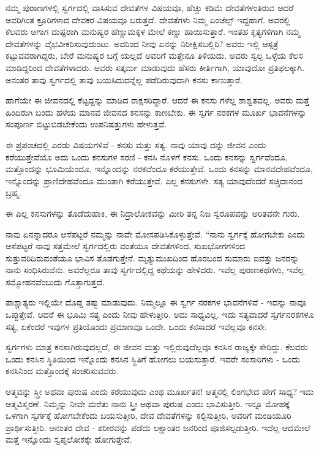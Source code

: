 ನಮ್ಮ ಪುರಾಣಗಳಲ್ಲಿ ಸ್ವರ್ಗದಲ್ಲಿ ವಾಸಿಸುವ ದೇವತೆಗಳ ವಿಷಯವೂ, ಹೆಚ್ಚು ಕಡಿಮೆ ದೇವತೆಗಳಂತಿರುವ ಆದರೆ ಅವರಿಗಿಂತ ಕ್ರೂರಿಗಳಾದ ದೇವಕರ ವಿಷಯವೂ ಬರುತ್ತದೆ. ದೇವತೆಗಳು ನಿಮ್ಮ ಏಂಜೆಲ್ಸ್  ಇದ್ದಹಾಗೆ. ಅವರಲ್ಲಿ ಕೆಲವರು ಆಗಾಗ ದುಷ್ಟರಾಗಿ ಮನುಷ್ಯರ ಹೆಣ್ಣುಮಕ್ಕಳ ಮೇಲೆ ಕಣ್ಣು ಹಾಯಿಸುತ್ತಾರೆ. ಇಂತಹ ಕೃತ್ಯಗಳಿಗಾಗಿ ನಮ್ಮ ದೇವತೆಗಳನ್ನು ವೈಭವೀಕರಿಸುವುದುಂಟು. ಅವರಿಂದ ನೀವು ಏನನ್ನು ನಿರೀಕ್ಷಿಸಬಲ್ಲಿರಿ? ಅವರು ಇಲ್ಲಿ ಆಸ್ಪತ್ರೆ ಕಟ್ಟುವವರಾಗಿದ್ದರು, ಬೇರೆ ಮನುಷ್ಯರ ಬಗ್ಗೆ ಯಲ್ಲದೆ ಅವರಿಗೆ ಮತ್ತೇನೂ ತಿಳಿಯದು. ಅವರು ಸ್ವಲ್ಪ ಒಳ್ಳೆಯ ಕೆಲಸ ಮಾಡಿದ್ದರಿಂದ ದೇವತೆಗಳಾದರು. ಅವರು ಸತ್ಕರ್ಮ ಮಾಡುವುದು ಹೆಸರು ಕೀರ್ತಿಗಾಗಿ, ಯಾವುದೋ ಪ್ರತಿಫಲಕ್ಕಾಗಿ. ಅನಂತರ ತಾವು ಸ್ವರ್ಗದಲ್ಲಿ ತಾವು ಬಯಸಿದುದನ್ನೆಲ್ಲ ಪಡೆದಿರುವುದಾಗಿ ಕನಸು ಕಾಣುತ್ತಾರೆ.

ಹಾಗೆಯೇ ಈ ಜೀವನದಲ್ಲಿ ಕೆಟ್ಟದ್ದನ್ನು ಮಾಡಿದ ರಾಕ್ಷಸರಿದ್ದಾರೆ. ಆದರೆ ಈ ಕನಸು ಗಳೆಲ್ಲ ಶಾಶ್ವತವಲ್ಲ. ಅವರು ಮತ್ತೆ ಹಿಂದಿರುಗಿ ಬಂದು ಹಳೆಯ ಮಾನವ ಜೀವನದ ಕನಸನ್ನು ಕಾಣಬೇಕು. ಈ ಸ್ವರ್ಗ ನರಕಗಳ ಮೂರ್ಖ ಭಾವನೆಗಳನ್ನು ಸಂಪೂರ್ಣ ಬಿಟ್ಟುಬಿಡಬೇಕೆಂದು ಉಪನಿಷತ್ತುಗಳು ಹೇಳುತ್ತವೆ.

ಈ ಪ್ರಪಂಚದಲ್ಲಿ ಎರಡು ವಿಷಯಗಳಿವೆ - ಕನಸು ಮತ್ತು ಸತ್ಯ. ನಾವು ಯಾವು ದನ್ನು ಜೀವನ ಎಂದು ಕರೆಯುತ್ತೇವೆಯೊ ಅದು ಒಂದು ಕನಸುಗಳ ಸರಣಿ - ಕನಸಿ ನೊಳಗೆ ಕನಸು. ಒಂದು ಕನಸನ್ನು ಸ್ವರ್ಗವೆಂದೂ, ಮತ್ತೊಂದನ್ನು ಭೂಮಿಯೆಂದೂ, ಇನ್ನೊಂದನ್ನು ನರಕವೆಂದೂ ಕರೆಯುತ್ತೇವೆ. ಒಂದು ಕನಸನ್ನು ಮಾನವದೇಹವೆಂದೂ, ಇನ್ನೊಂದನ್ನು ಪ್ರಾಣಿದೇಹವೆಂದೂ ಮುಂತಾಗಿ ಕರೆಯುತ್ತೇವೆ. ಎಲ್ಲ ಕನಸುಗಳೇ. ಸತ್ಯ ಯಾವುದೆಂದರೆ ಸಚ್ಚಿದಾನಂದ ಬ್ರಹ್ಮ.

ಈ ಎಲ್ಲ ಕನಸುಗಳನ್ನು ತೊಡೆದುಹಾಕಿ, ಈ ನಿದ್ರಾಲೋಕವನ್ನು ಮೀರಿ ತನ್ನ ನಿಜ ಸ್ವರೂಪವನ್ನು ಅರಿತವನೇ ಗುರು.

ನಾವು ಏನನ್ನಾದರೂ ಆಸೆಪಟ್ಟರೆ ನಮ್ಮನ್ನು ನಾವೇ ಮೋಸಪಡಿಸಿಕೊಳ್ಳುತ್ತೇವೆ. “ನಾನು ಸ್ವರ್ಗಕ್ಕೆ ಹೋಗಬೇಕು ಎಂದು ಆಸೆಪಟ್ಟರೆ ನಾವು ಸತ್ತಮೇಲೆ ಸ್ವರ್ಗದಲ್ಲಿರು ವಂತೆಯೂ ದೇವತೆಗಳಿಂದ, ಸುಖಭೋಗಗಳಿಂದ ಸುತ್ತುವರಿದಿರುವಂತೆಯೂ ಭಾವಿಸ ತೊಡಗುತ್ತೇನೆ. ಮೃತ್ಯುಮುಖದಿಂದ ಹೊರಬಂದ ಸುಮಾರು ಐವತ್ತು ಜನರನ್ನು ನಾನು ಸಂಧಿಸಿರುವೆನು. ಅವರೆಲ್ಲರೂ ತಾವು ಸ್ವರ್ಗದಲ್ಲಿದ್ದ ಕಥೆಯನ್ನು ಹೇಳಿದರು. ಇವೆಲ್ಲ ಪುರಾಣಕಥೆಗಳು, ಇವೆಲ್ಲ ಸಮ್ಮೋಹನವೆಂಬುದು ಗೊತ್ತಾಗುತ್ತದೆ.

ಪಾಶ್ಚಾತ್ಯರು ಇಲ್ಲಿಯೇ ದೊಡ್ಡ ತಪ್ಪು ಮಾಡುವುದು. ನಿಮ್ಮಲ್ಲೂ ಈ ಸ್ವರ್ಗ ನರಕಗಳ ಭಾವನೆಗಳಿವೆ - ಇದನ್ನು ನಾವೂ ಒಪ್ಪುತ್ತೇವೆ. ಆದರೆ ಈ ಭೂಮಿ ಸತ್ಯ ಎಂದು ನೀವು ಹೇಳುತ್ತೀರಿ. ಅದು ಸಾಧ್ಯವಿಲ್ಲ. ಇದು ಸತ್ಯವಾದರೆ ಸ್ವರ್ಗನರಕಗಳೂ ಸತ್ಯ, ಏಕೆಂದರೆ ಇವುಗಳ ಪ್ರತಿಯೊಂದು ಪ್ರಮಾಣವೂ ಒಂದೇ. ಒಂದು ಕನಸಾದರೆ ಇವೆಲ್ಲವೂ ಕನಸೇ.

ಸ್ವರ್ಗಗಳು ಮಾತ್ರ ಕನಸಾಗಿರುವುದಲ್ಲದೆ, ಈ ಜೀವನ ಮತ್ತು ಇಲ್ಲಿರುವುದೆಲ್ಲವೂ ಕನಸಿನ ರಾಜ್ಯಕ್ಕೇ ಸೇರಿದ್ದು. ಕೆಲವರು ಒಂದು ಕನಸಿನ ಸ್ಥಿತಿಯಿಂದ ಇನ್ನೊಂದು ಕನಸಿನ ಸ್ಥಿತಿಗೆ ಹೋಗಲು ಬಯಸುತ್ತಾರೆ. ಇವರೇ ಸಂಸಾರಿಗಳು - ಒಂದು ಕನಸಿನಿಂದ ಮತ್ತೊಂದಕ್ಕೆ ಸಂಚರಿಸುವವರು.

ಆತ್ಮವನ್ನು ಸ್ತ್ರೀ ಅಥವಾ ಪುರುಷ ಎಂದು ಕರೆಯುವುದು ಎಂಥ ಮೂರ್ಖತನ! ಆತ್ಮನಲ್ಲಿ ಲಿಂಗಭೇದ ಹೇಗೆ ಸಾಧ್ಯ? ಇದು ಆತ್ಮವಿಸ್ಮರಣೆ. ನಿಮ್ಮನ್ನು ನೀವೇ ಮರೆತು ನಾನು ಸ್ತ್ರೀ ಅಥವಾ ಪುರುಷ ಎಂದು ಭಾವಿಸುತ್ತೀರಿ. ಇನ್ನೂ ಮೋಹಕ್ಕೆ ಒಳಗಾಗಿ ಸ್ವರ್ಗಕ್ಕೆ ಹೋಗಬೇಕೆಂದು ಬಯಸುತ್ತೀರಿ, ದೇವ ದೇವತೆಗಳನ್ನು ಕಲ್ಪಿಸುತ್ತೀರಿ, ಅವರಿಗೆ ಮಂಡಿಯೂರಿ ಪ್ರಾರ್ಥಿಸುತ್ತೀರಿ. ಆನಂತರ ದೇವ - ಶರೀರವನ್ನು ಪಡೆದು ಲಕ್ಷಾಂತರ ಜನರಿಂದ ಪೂಜಿಸಲ್ಪಡುತ್ತೀರಿ. ಇದೆಲ್ಲ ಆದಮೇಲೆ ಮತ್ತೆ ಇನ್ನೊಂದು ಸ್ವಪ್ನಲೋಕಕ್ಕೇ ಹೋಗುತ್ತೇವೆ.

